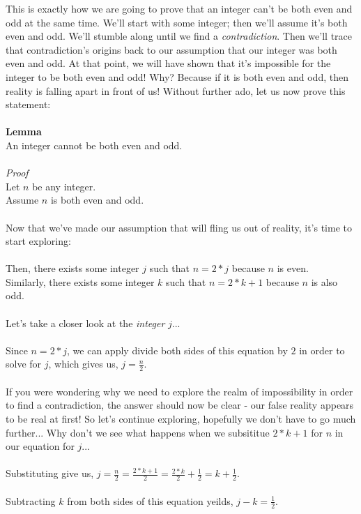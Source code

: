 \documentclass[a4paper,12pt]{article}
\begin{document}
This is exactly how we are going to prove that an integer can't be both even and odd at the same time. We'll start with some integer; then we'll assume it's both even and odd. We'll stumble along until we find a \textit{contradiction}. Then we'll trace that contradiction's origins back to our assumption that our integer was both even and odd. At that point, we will have shown that it's impossible for the integer to be both even and odd! Why? Because if it is both even and odd, then reality is falling apart in front of us! Without further ado, let us now prove this statement:\\
\\
\textbf{Lemma}\\
An integer cannot be both even and odd.\\
\\
\textit{Proof}\\
Let $n$ be any integer.\\
Assume $n$ is both even and odd.\\
\\
Now that we've made our assumption that will fling us out of reality, it's time to start exploring:\\
\\
Then, there exists some integer $j$ such that $n = 2*j$ because $n$ is even.\\
Similarly, there exists some integer $k$ such that $n = 2*k + 1$ because $n$ is also odd.\\
\\
Let's take a closer look at the \textit{integer} $j$...\\
\\
Since $n = 2*j$, we can apply divide both sides of this equation by $2$ in order to solve for $j$, which gives us, $j = \frac{n}{2}$.\\
\\
If you were wondering why we need to explore the realm of impossibility in order to find a contradiction, the answer should now be clear - our false reality appears to be real at first! So let's continue exploring, hopefully we don't have to go much further... Why don't we see what happens when we subsititue $2*k + 1$ for $n$ in our equation for $j$...\\
\\
Substituting give us, $j = \frac{n}{2} = \frac{2*k + 1}{2} = \frac{2*k}{2} + \frac{1}{2} = k + \frac{1}{2}$.\\
\\ 
Subtracting $k$ from both sides of this equation yeilds, $j - k = \frac{1}{2}$.\\
\end{document}
